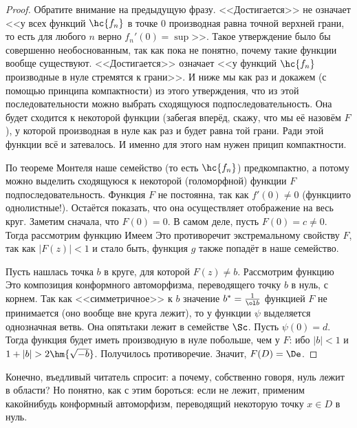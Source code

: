 \documentclass[a4paper]{article}
\begin{document}
\begin{proof}
Обратите внимание на предыдущую фразу. <<Достигается>> не означает <<у всех функций $\hc{f_n}$ в точке 0 производная равна точной верхней грани, то есть для любого $n$ верно $f_n'(0) = \sup$>>. Такое утверждение было бы совершенно необоснованным, так как пока не понятно, почему такие функции вообще существуют. <<Достигается>> означает <<у функций $\hc{f_n}$ производные в нуле стремятся к грани>>. И ниже мы как раз и докажем (с помощью принципа компактности) из этого утверждения, что из этой последовательности можно выбрать сходящуюся подпоследовательность. Она будет сходится к некоторой функции (забегая вперёд, скажу, что мы её назовём $F$), у которой производная в нуле как раз и будет равна той грани. Ради этой функции всё и затевалось. И именно для этого нам нужен прицип компактности.

По теореме Монтеля наше семейство (то есть $\hc{f_n}$) предкомпактно, а потому можно выделить сходящуюся к некоторой (голоморфной) функции $F$ подпоследовательность. Функция $F$ не постоянна, так как $f'(0)\neq 0$ (функции\д то однолистные!). Остаётся показать, что она осуществляет отображение на весь круг.
Заметим сначала, что $F(0)=0$. В самом деле, пусть $F(0)=c\neq 0$. Тогда рассмотрим функцию
Имеем
Это противоречит экстремальному свойству $F$, так как $|F(z)|< 1$ и стало быть, функция $g$ также попадёт в наше семейство.

Пусть нашлась точка $b$ в круге, для которой $F(z)\neq b$. Рассмотрим функцию
Это композиция конформного автоморфизма, переводящего точку $b$ в нуль, с корнем. Так как <<симметричное>> к $b$
значение $b^* = \frac{1}{\ol b}$ функцией $F$ не принимается (оно вообще вне круга лежит), то у функции $\psi$
выделяется однозначная ветвь. Она опять\д таки лежит в семействе $\Sc$. Пусть $\psi(0) = d$. Тогда
функция
будет иметь производную в нуле побольше, чем у $F$:
ибо $|b|<1$ и $1+|b|>2\hm{\sqrt{-b}}$. Получилось противоречие. Значит, $F(D) = \De$.
\end{proof}

\begin{note}
Конечно, въедливый читатель спросит: а почему, собственно говоря, нуль лежит в области? Но понятно, как с этим
бороться: если не лежит, применим какой\д нибудь конформный автоморфизм, переводящий некоторую точку $x\in D$ в нуль.
\end{note}
\end{document}
